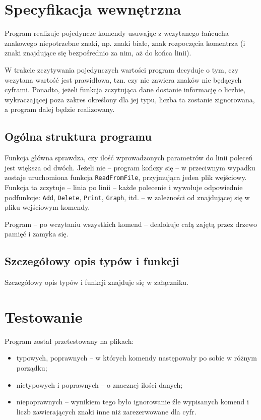 \documentclass[12pt,a4paper,twoside]{article}
\begin{document}
\section{Specyfikacja wewnętrzna}\label{sec:sp-wew}

Program realizuje pojedyncze komendy usuwając z wczytanego łańcucha znakowego niepotrzebne znaki, np. znaki białe, znak rozpoczęcia komentrza (i znaki znajdujące się bezpośrednio za nim, aż do końca linii).

W trakcie zczytywania pojedynczych wartości program decyduje o tym, czy wczytana wartość jest prawidłowa, tzn. czy nie zawiera znaków nie będących cyframi. Ponadto, jeżeli funkcja zczytująca dane dostanie informację o liczbie, wykraczającej poza zakres określony dla jej typu, liczba ta zostanie zignorowana, a program dalej będzie realizowany.

\subsection{Ogólna struktura programu}

Funkcja główna sprawdza, czy ilość wprowadzonych parametrów do linii poleceń jest większa od dwóch. Jeżeli nie – program kończy się – w przeciwnym wypadku zostaje uruchomiona funkcja \lstinline|ReadFromFile|, przyjmująca jeden plik wejściowy. Funkcja ta zczytuje – linia po linii – każde polecenie i wywołuje odpowiednie podfunkcje: \lstinline|Add|, \lstinline|Delete|, \lstinline|Print|, \lstinline|Graph|, itd. – w zależności od znajdującej się w pliku wejściowym komendy.

Program – po wczytaniu wszystkich komend – dealokuje całą zajętą przez drzewo pamięć i zamyka się.
	
\subsection{Szczegółowy opis typów i funkcji}

Szczegółowy opis typów i funkcji znajduje się w załączniku.

\section{Testowanie}
Program został przetestowany na plikach:
\begin{itemize}
	\item{typowych, poprawnych – w których komendy następowały po sobie w różnym porządku;}
	\item{nietypowych i poprawnych – o znacznej ilości danych;}
	\item{niepoprawnych – wynikiem tego było ignorowanie źle wypisanych komend i liczb zawierających znaki inne niż 	 zarezerwowane dla cyfr.}
\end{itemize}
\end{document}
